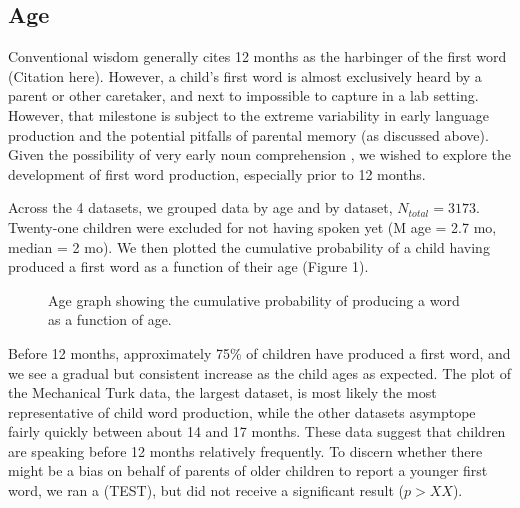 \documentclass[10pt,letterpaper]{article}
\begin{document}
\subsection{Age} 

Conventional wisdom generally cites 12 months as the harbinger of the first word (Citation here). However, a child's first word is almost exclusively heard by a parent or other caretaker, and next to impossible to capture in a lab setting. However, that milestone is subject to the extreme variability in early language production  \cite{fenson1994} and the potential pitfalls of parental memory (as discussed above). Given the possibility of very early noun comprehension \cite{tincoff1999,tincoff2012,bergelson2012}, we wished to explore the development of first word production, especially prior to 12 months.

Across the 4 datasets, we grouped data by age and by dataset, $N_{total} = 3173$. Twenty-one children were excluded for not having spoken yet (M age  = 2.7 mo, median = 2 mo). We then plotted the cumulative probability of a child having produced a first word as a function of their age (Figure 1).

\begin{figure}[t]
	\caption{\label{fig:cdfs}  Age graph showing the cumulative probability of producing a word as a function of age.}
\end{figure}

Before 12 months, approximately 75\% of children have produced a first word, and we see a gradual but consistent increase as the child ages as expected. The plot of the Mechanical Turk data, the largest dataset, is most likely the most representative of child word production, while the other datasets asymptope fairly quickly between about 14 and 17 months. 
These data suggest that children are speaking before 12 months relatively frequently. To discern whether there might be a bias on behalf of parents of older children to report a younger first word, we ran a (TEST), but did not receive a significant result ($p > XX$).
\end{document}
